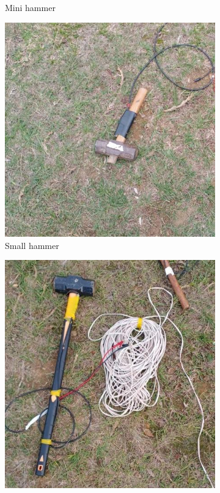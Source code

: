 \begin{figure}[!t]
\begin{subfigure}[b]{0.45\textwidth}
        \caption{Mini hammer}
        \label{fig:fieldtestb}
    \end{subfigure}
    \hfill
    \begin{subfigure}[b]{0.45\textwidth}
        \centering
        \includegraphics[width=\textwidth]{images/fieldtestc}
        \caption{Small hammer}
        \label{fig:fieldtestc}
    \end{subfigure}
    \hfill
    \begin{subfigure}[b]{0.45\textwidth}
        \centering
        \includegraphics[width=\textwidth]{images/fieldtestd}

\end{subfigure}
\end{figure}
